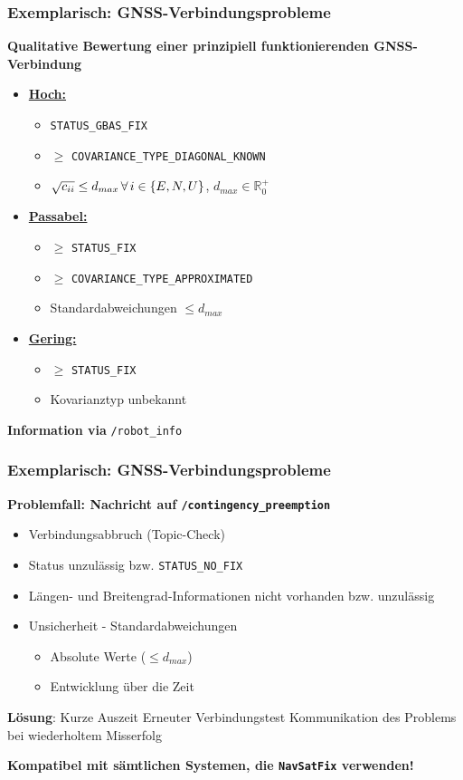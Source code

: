 \documentclass{beamer}
\newcommand{\code}[1]{\colorbox{light-gray}{\texttt{#1}}}
\begin{document}
\begin{frame}
  \frametitle{Exemplarisch: GNSS-Verbindungsprobleme}
  \textbf{Qualitative Bewertung einer prinzipiell funktionierenden GNSS-Verbindung}
  \begin{itemize}
    \item \underline{\textbf{Hoch:}}
    \begin{itemize}
      \item \code{STATUS\_GBAS\_FIX}
      \item $\geq$ \code{COVARIANCE\_TYPE\_DIAGONAL\_KNOWN}
      \item $\sqrt{c_{ii}} \leq d_{max} \thinspace \forall \thinspace i \in \{E, N, U\}$, $d_{max} \in \mathbb{R}_{0}^{+}$
    \end{itemize}
    \item \underline{\textbf{Passabel:}}
    \begin{itemize}
      \item $\geq$ \code{STATUS\_FIX}
      \item $\geq$ \code{COVARIANCE\_TYPE\_APPROXIMATED}
      \item Standardabweichungen $\leq d_{max}$
    \end{itemize}
    \item \underline{\textbf{Gering:}}
    \begin{itemize}
      \item $\geq$ \code{STATUS\_FIX}
      \item Kovarianztyp unbekannt
    \end{itemize}
  \end{itemize}
  \textbf{Information via} \code{/robot\_info}
\end{frame}

\begin{frame}
  \frametitle{Exemplarisch: GNSS-Verbindungsprobleme}
  \textbf{Problemfall: Nachricht auf \code{/contingency\_preemption}}
  \begin{itemize}
    \item Verbindungsabbruch (Topic-Check)
    \item Status unzulässig bzw. \code{STATUS\_NO\_FIX}
    \item Längen- und Breitengrad-Informationen nicht vorhanden bzw. unzulässig
    \item Unsicherheit - Standardabweichungen
    \begin{itemize}
      \item Absolute Werte ($\leq d_{max}$)
      \item Entwicklung über die Zeit
    \end{itemize}
  \end{itemize}
  \textbf{Lösung}: Kurze Auszeit \textrightarrow \thinspace Erneuter Verbindungstest \textrightarrow \thinspace Kommunikation des Problems bei wiederholtem Misserfolg

  \textbf{Kompatibel mit sämtlichen Systemen, die \code{NavSatFix} verwenden!}
\end{frame}
\end{document}
